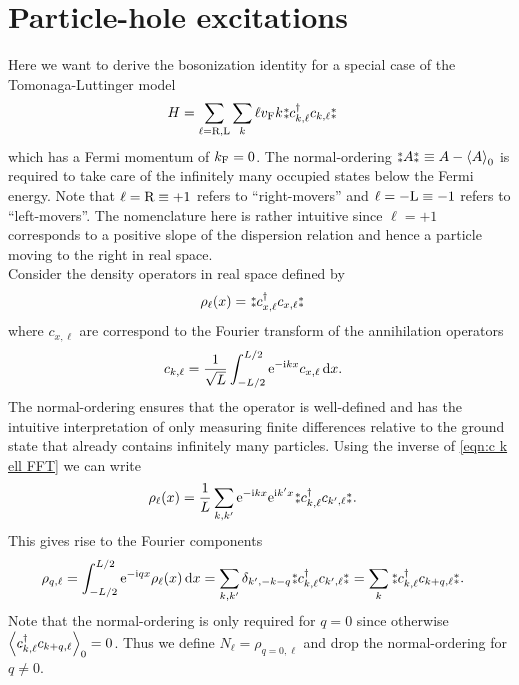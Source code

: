 \documentclass[english, parskip=full]{scrartcl}
\begin{document}
\section{Particle-hole excitations}
Here we want to derive the bosonization identity for a special case of the Tomonaga-Luttinger model
\begin{align}
H &= \sum_{\ell=\R,\L} \sum_k \ell \vf k \varnormord{c_{k,\ell}^\dagger c_{k,\ell}}
\end{align}
which has a Fermi momentum of $\kf =0$.
The normal-ordering $\varnormord{A} \equiv A - \bra*{A}_0$ is required to take care of the infinitely many occupied states below the Fermi energy.
Note that $\ell=\R\equiv +1$ refers to ``right-movers'' and $\ell=-\L\equiv -1$ refers to ``left-movers''.
The nomenclature here is rather intuitive since $\ell=+1$ corresponds to a positive slope of the dispersion relation and hence a particle moving to the right in real space.
\\
Consider the density operators in real space defined by
\begin{align}
\rho_\ell(x) &= \varnormord{c_{x,\ell}^\dagger c_{x,\ell}} 
\end{align}
where $c_{x,\ell}$ are correspond to the Fourier transform of the annihilation operators
\begin{align}
c_{k,\ell} &= \frac{1}{\sqrt{L}} \intx{-L/2}{L/2}{\powe{-\i kx} c_{x,\ell}}{x}. \label{eqn:c k ell FFT}
\end{align}
The normal-ordering ensures that the operator is well-defined and has the intuitive interpretation of only measuring finite differences relative to the ground state that already contains infinitely many particles.
Using the inverse of \autoref{eqn:c k ell FFT} we can write
\begin{align}
\rho_\ell(x) &= \frac{1}{L} \sum_{k,k'} \powe{-\i kx} \powe{\i k'x} \varnormord{c_{k,\ell}^\dagger c_{k',\ell}}.
\end{align}
This gives rise to the Fourier components 
\begin{align}
\rho_{q,\ell} &= \intx{-L/2}{L/2}{\powe{-\i qx} \rho_\ell(x)}{x} = \sum_{k,k'} \delta_{k',-k-q} \varnormord{c_{k,\ell}^\dagger c_{k',\ell}} = \sum_k \varnormord{c_{k,\ell}^\dagger c_{k+q,\ell}}.
\end{align}
Note that the normal-ordering is only required for $q=0$ since otherwise $\bra*{c_{k,\ell}^\dagger c_{k+q,\ell}}_0=0$.
Thus we define $N_\ell = \rho_{q=0,\ell}$ and drop the normal-ordering for $q\neq 0$.
\\
\end{document}
